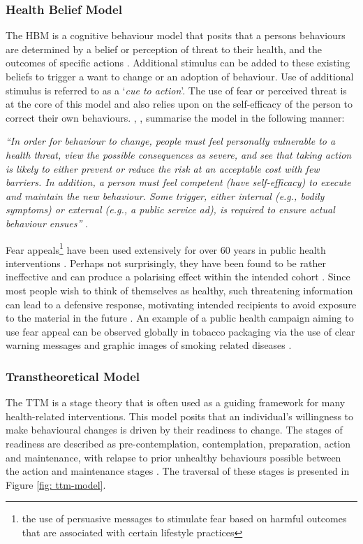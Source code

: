 \subsubsection{Health Belief Model}
The HBM is a cognitive behaviour model that posits that a persons behaviours are determined by a belief or perception of threat to their health, and the outcomes of specific actions \cite{Morris2012a}. Additional stimulus can be added to these existing beliefs to trigger a want to change or an adoption of behaviour. Use of additional stimulus is referred to as a `\textit{cue to action}'. The use of fear or perceived threat is at the core of this model and also relies upon on the self-efficacy of the person to correct their own behaviours. \citeauthor{Nisbet2008}, \citeyear{Nisbet2008}, summarise the model in the following manner:
\begin{displayquote}
	\textit{``In order for behaviour to change, people must feel personally vulnerable to a health threat, view the possible consequences as severe, and see that taking action is likely to either prevent or reduce the risk at an acceptable cost with few barriers. In addition, a person must feel competent (have self-efficacy) to execute and maintain the new behaviour. Some trigger, either internal (e.g., bodily symptoms) or external (e.g., a public service ad), is required to ensure actual behaviour ensues''} \cite{Nisbet2008}.
\end{displayquote}

Fear appeals\footnote{the use of persuasive messages to stimulate fear based on harmful outcomes that are associated with certain lifestyle practices} have been used extensively for over 60 years in public health interventions \cite{Ruiter2014, Rice2012}. Perhaps not surprisingly, they have been found to be rather ineffective and can produce a polarising effect within the intended cohort \cite{Ruiter2014}. Since most people wish to think of themselves as healthy, such threatening information can lead to a defensive response, motivating intended recipients to avoid exposure to the material in the future \cite{Ruiter2014}. An example of a public health campaign aiming to use fear appeal can be observed globally in tobacco packaging via the use of clear warning messages and graphic images of smoking related diseases \cite{Ruiter2014}.

\subsubsection{Transtheoretical Model}
The TTM is a stage theory that is often used as a guiding framework for many health-related interventions. This model posits that an individual’s willingness to make behavioural changes is driven by their readiness to change. The stages of readiness are described as pre-contemplation, contemplation, preparation, action and maintenance, with relapse to prior unhealthy behaviours possible between the action and maintenance stages \cite{Prochaska2005}. The traversal of these stages is presented in Figure \ref{fig: ttm-model}.

